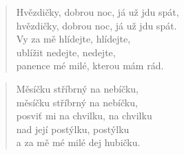 \begin{song}{}
\begin{verse}
   Hvězdičky, dobrou noc, já už jdu spát, \\
   hvězdičky, dobrou noc, já už jdu spát. \\
   Vy za mě hlídejte, hlídejte,  \\
   ublížit nedejte, nedejte, \\
   panence mé milé, kterou mám rád.
\end{verse}
\begin{verse}
   Měsíčku stříbrný na nebíčku, \\
   měsíčku stříbrný na nebíčku, \\
   posviť mi na chvilku, na chvilku \\
   nad její postýlku, postýlku \\
   a za mě mé milé dej hubičku.
\end{verse}
\end{song}
\pagebreak
